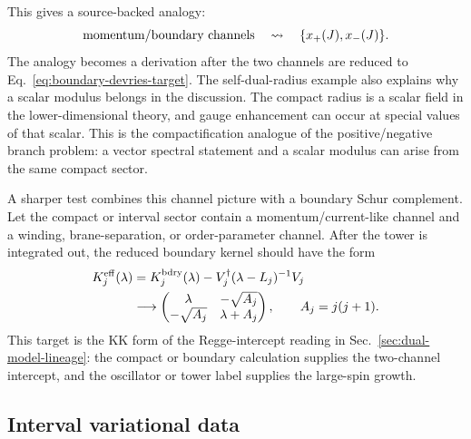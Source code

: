 This gives a source-backed analogy:
\begin{equation}
  \hbox{momentum/boundary channels}
  \quad\leadsto\quad
  \{x_+(J),x_-(J)\}.
  \label{eq:momentum-winding-channel}
\end{equation}
The analogy becomes a derivation after the two channels are reduced to Eq.~\eqref{eq:boundary-devries-target}.  The self-dual-radius example also explains why a scalar modulus belongs in the discussion.  The compact radius is a scalar field in the lower-dimensional theory, and gauge enhancement can occur at special values of that scalar.  This is the compactification analogue of the positive/negative branch problem: a vector spectral statement and a scalar modulus can arise from the same compact sector.

A sharper test combines this channel picture with a boundary Schur complement.
Let the compact or interval sector contain a momentum/current-like channel and a
winding, brane-separation, or order-parameter channel.  After the tower is
integrated out, the reduced boundary kernel should have the form
\begin{equation}
  \begin{aligned}
  K^{\rm eff}_{j}(\lambda)
  &=
  K^{\rm bdry}_{j}(\lambda)
  -
  V_j^\dagger(\lambda-L_j)^{-1}V_j\\
  &\longrightarrow
  \begin{pmatrix}
  \lambda&-\sqrt{A_j}\\
  -\sqrt{A_j}&\lambda+A_j
  \end{pmatrix},
  \qquad A_j=j(j+1).
  \end{aligned}
  \label{eq:kk-regge-schur-target}
\end{equation}
This target is the KK form of the Regge-intercept reading in
Sec.~\ref{sec:dual-model-lineage}: the compact or boundary calculation supplies
the two-channel intercept, and the oscillator or tower label supplies the
large-spin growth.

\subsection{Interval variational data}
\label{sec:interval-variational-data}

